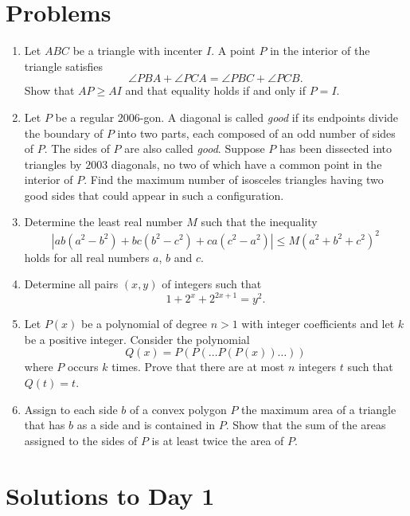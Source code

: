 \documentclass[11pt]{scrartcl}
\begin{document}
\section{Problems}
\begin{enumerate}[\bfseries 1.]
\item %
Let $ABC$ be a triangle with incenter $I$.
A point $P$ in the interior of the triangle satisfies
\[ \angle PBA + \angle PCA = \angle PBC + \angle PCB. \]
Show that $AP \ge AI$ and that equality holds if and only if $P=I$.

\item %
Let $P$ be a regular $2006$-gon.
A diagonal is called \emph{good} if its endpoints
divide the boundary of $P$ into two parts,
each composed of an odd number of sides of $P$.
The sides of $P$ are also called \emph{good}.
Suppose $P$ has been dissected into triangles by $2003$ diagonals,
no two of which have a common point in the interior of $P$.
Find the maximum number of isosceles triangles having two good
sides that could appear in such a configuration.

\item %
Determine the least real number $M$ such that the inequality
\[ \left\lvert ab(a^2-b^2)+bc(b^2-c^2)+ca(c^2-a^2) \right\rvert
  \leq M\left( a^2+b^2+c^2 \right)^2 \]
holds for all real numbers $a$, $b$ and $c$.

\item %
Determine all pairs $(x,y)$ of integers such that
\[ 1 + 2^x + 2^{2x+1} = y^2. \]

\item %
Let $P(x)$ be a polynomial of degree $n > 1$
with integer coefficients and let $k$ be a positive integer.
Consider the polynomial
\[ Q(x) = P(P(\dots P(P(x)) \dots )) \] where $P$ occurs $k$ times.
Prove that there are at most $n$ integers $t$ such that $Q(t) = t$.

\item %
Assign to each side $b$ of a convex polygon $P$
the maximum area of a triangle that has $b$ as a side and is contained in $P$.
Show that the sum of the areas assigned to the sides of $P$ is at least twice the area of $P$.

\end{enumerate}
\pagebreak

\section{Solutions to Day 1}
\end{document}
